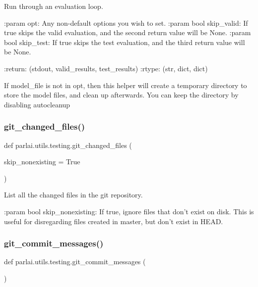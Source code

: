 \begin{DoxyVerb}Run through an evaluation loop.

:param opt:
    Any non-default options you wish to set.
:param bool skip_valid:
    If true skips the valid evaluation, and the second return value will be None.
:param bool skip_test:
    If true skips the test evaluation, and the third return value will be None.

:return: (stdout, valid_results, test_results)
:rtype: (str, dict, dict)

If model_file is not in opt, then this helper will create a temporary directory
to store the model files, and clean up afterwards. You can keep the directory
by disabling autocleanup
\end{DoxyVerb}
 \mbox{\label{namespaceparlai_1_1utils_1_1testing_a2e61f8f35b8ccf518e3561a224781ced}} 
\subsubsection{\texorpdfstring{git\+\_\+changed\+\_\+files()}{git\_changed\_files()}}
{\footnotesize\ttfamily def parlai.\+utils.\+testing.\+git\+\_\+changed\+\_\+files (\begin{DoxyParamCaption}\item[{}]{skip\+\_\+nonexisting = {\ttfamily True} }\end{DoxyParamCaption})}

\begin{DoxyVerb}List all the changed files in the git repository.

:param bool skip_nonexisting:
    If true, ignore files that don't exist on disk. This is useful for
    disregarding files created in master, but don't exist in HEAD.
\end{DoxyVerb}
 \mbox{\label{namespaceparlai_1_1utils_1_1testing_aa9971204bea89f174596698b2e736214}} 
\subsubsection{\texorpdfstring{git\+\_\+commit\+\_\+messages()}{git\_commit\_messages()}}
{\footnotesize\ttfamily def parlai.\+utils.\+testing.\+git\+\_\+commit\+\_\+messages (\begin{DoxyParamCaption}{ }\end{DoxyParamCaption})}

